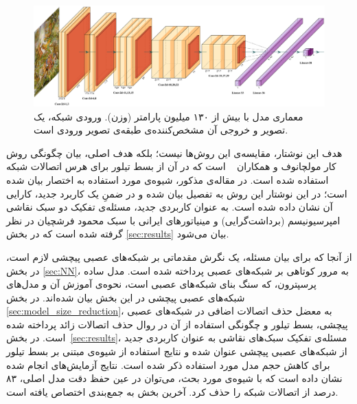 \documentclass[11pt, twoside]{imsproc}
\let\LTRfootnote\footnoteA
\begin{document}
\begin{figure}[t]
\centering
\includegraphics[width=1\linewidth]{images/vgg16.pdf}
\caption{
معماری مدل
 \cite{VGG_Simonyan15}
با بیش از ۱۳۰ میلیون پارامتر (وزن). ورودی شبکه، یک تصویر و خروجی آن مشخص‌کننده‌ی طبقه‌ی تصویر ورودی است.
}
\label{fig:vgg16}
\end{figure}


هدف این نوشتار، مقایسه‌ی این روش‌ها نیست؛ بلکه هدف اصلی، بیان چگونگی روش کار مولچانوف و همکاران
~\cite{MolchanovTKAK17}
است که در آن از بسط تیلور برای هرس اتصالات شبکه استفاده شده است. در مقاله‌ی مذکور، شیوه‌ی مورد استفاده به اختصار بیان شده است؛ در این نوشتار این روش به تفصیل بیان شده و در ضمنِ یک کاربرد جدید،‌ کارایی آن نشان داده شده است.
به عنوان کاربردی جدید، مسئله‌‌ی تفکیک دو سبک نقاشی امپرسیونیسم%
\LTRfootnote{Impersionism}
 (برداشت‌گرایی) و
مینیاتورهای ایرانی با سبک محمود فرشچیان در نظر گرفته شده است که در بخش
\ref{sec:results}
 بیان می‌شود.

 از آنجا که برای بیان مسئله، یک نگرش مقدماتی بر شبکه‌های عصبی پیچشی لازم است، در بخش
 \ref{sec:NN}، 
 به مرور کوتاهی بر شبکه‌های عصبی پرداخته شده است. مدل ساده پرسپترون، که سنگ بنای شبکه‌های عصبی است، نحوه‌ی آموزش آن و مدل‌های شبکه‌های عصبی پیچشی در این بخش بیان شده‌اند.
 در بخش
 \ref{sec:model_size_reduction}، 
به معضل حذف اتصالات اضافی در شبکه‌های عصبی پیچشی،
  بسط تیلور و چگونگی استفاده از آن در روال حذف اتصالات زائد پرداخته شده است.
 در بخش~\ref{sec:results}، 
مسئله‌ی تفکیک سبک‌های نقاشی به عنوان کاربردی جدید از شبکه‌های عصبی پیچشی عنوان شده و نتایج استفاده از شیوه‌ی مبتنی بر بسط تیلور برای کاهش حجم مدل مورد استفاده ذکر شده است.
 نتایج آزمایش‌های انجام شده نشان داده است که با شیوه‌ی مورد بحث، می‌توان در عین حفظ دقت مدل اصلی،  ۸۳ درصد از اتصالات شبکه را حذف کرد.
  آخرین بخش به جمع‌بندی اختصاص یافته است.
\end{document}
